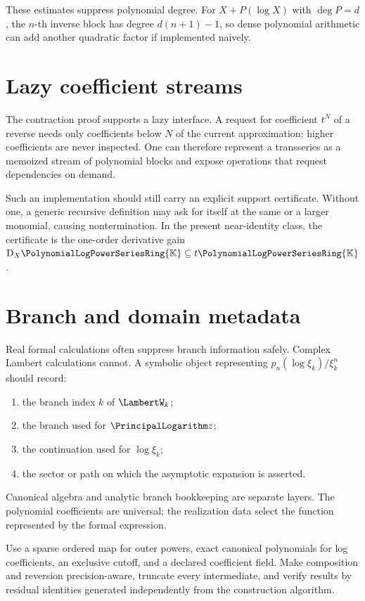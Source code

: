 \documentclass[11pt,oneside,openany]{book}
\newcommand{\K}{\mathbb{K}}
\newcommand{\Rring}{\PolynomialLogPowerSeriesRing{\K}}
\newcommand{\D}{\mathrm{D}}
\begin{document}
These estimates suppress polynomial degree.  For \(X+P(\log X)\) with
\(\deg P=d\), the \(n\)-th inverse block has degree \(d(n+1)-1\), so dense
polynomial arithmetic can add another quadratic factor if implemented naively.

\section{Lazy coefficient streams}
The contraction proof supports a lazy interface.  A request for coefficient
\(t^N\) of a reverse needs only coefficients below \(N\) of the current
approximation; higher coefficients are never inspected.  One can therefore
represent a transseries as a memoized stream of polynomial blocks and expose
operations that request dependencies on demand.

Such an implementation should still carry an explicit support certificate.
Without one, a generic recursive definition may ask for itself at the same or a
larger monomial, causing nontermination.  In the present near-identity class,
the certificate is the one-order derivative gain
\(\D_X\Rring\subseteq t\Rring\).

\section{Branch and domain metadata}
Real formal calculations often suppress branch information safely.  Complex
Lambert calculations cannot.  A symbolic object representing
\(p_n(\log\xi_k)/\xi_k^n\) should record:

\begin{enumerate}
\item the branch index \(k\) of \(\LambertW_k\);
\item the branch used for \(\PrincipalLogarithm z\);
\item the continuation used for \(\log\xi_k\);
\item the sector or path on which the asymptotic expansion is asserted.
\end{enumerate}

Canonical algebra and analytic branch bookkeeping are separate layers.  The
polynomial coefficients are universal; the realization data select the
function represented by the formal expression.

\begin{summarybox}
Use a sparse ordered map for outer powers, exact canonical polynomials for log
coefficients, an exclusive cutoff, and a declared coefficient field.  Make
composition and reversion precision-aware, truncate every intermediate, and
verify results by residual identities generated independently from the
construction algorithm.
\end{summarybox}
\end{document}
